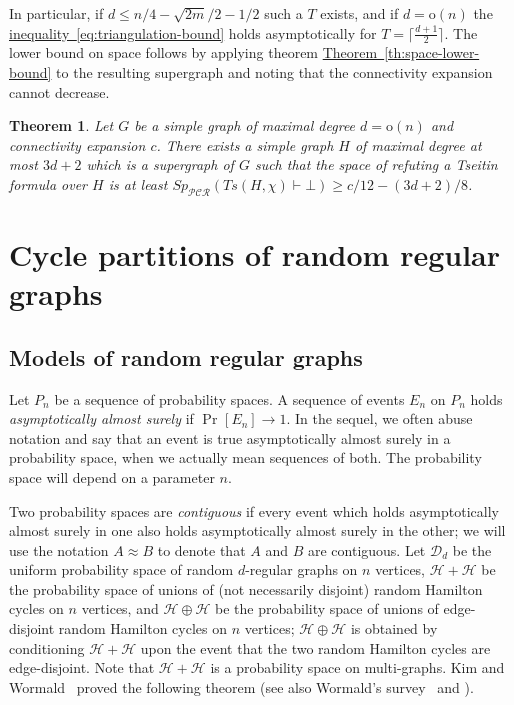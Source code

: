 \documentclass[11pt]{article}
\numberwithin{equation}{section}
\newtheorem{theorem}{Theorem}[section]
\theoremstyle{definition}
\theoremstyle{plain}
\newcommand{\expref}[2]{\hyperref[#2]{#1~\ref{#2}}}
\newcommand{\expeqref}[2]{\hyperref[#2]{#1~\eqref{#2}}}
\theoremstyle{plain}
\theoremstyle{definition}
\newcommand{\refth}[1]{\expref{Theorem}{#1}}
\newcommand{\littleoh}[1]{\mathrm{o} ( #1 )}
\newcommand{\Ceiling}[1]{\bigl \lceil #1 \bigr \rceil}
\newcommand{\prob}[2][]{\Pr_{#1} [ #2 ]}
\newcommand{\proofsystemsubindexformat}[1]{\scriptscriptstyle{\mathcal{#1}}}
\newcommand{\pcrnot}{\proofsystemsubindexformat{PCR}}
\newcommand{\derivabbrevsmall}[2]{( #1 \vdash #2 )}
\newcommand{\refutabbrevsmall}[1]{\derivabbrevsmall{#1}{\!\bot}}
\newcommand{\genericrefsmall}[3]{{\mathit{#1}}_{#2}\refutabbrevsmall{#3}}
\newcommand{\mspaceref}[2][]{\genericrefsmall{Sp}{#1}{#2}}
\newcommand{\formulaformat}[1]{\mathit{#1}}
\newcommand{\tseitinnot}[2]{\formulaformat{Ts}({#1,#2})}
\newcommand{\tends}{\longrightarrow}
\newcommand{\probspace}{\mathcal}
\newcommand{\psReg}{\probspace{D}}
\newcommand{\psHam}{\probspace{H}}
\newcommand{\connectivityexpansionnot}{c}
\newcommand{\tseitincharge}{\chi}
\begin{document}
In particular, if $d\leq n/4-\sqrt{2 m}/2-1/2$ such a $T$ exists, and if $d=\littleoh{n}$ the \expeqref{inequality}{eq:triangulation-bound} holds asymptotically for $T=\Ceiling{\frac{d+1}{2}}$. The lower bound on space follows by applying theorem \refth{th:space-lower-bound} to the resulting supergraph and noting that the connectivity expansion cannot decrease.

\begin{theorem}
\label{th:triangulation}
Let $G$ be a simple graph of maximal degree $d=\littleoh{n}$ and connectivity expansion $\connectivityexpansionnot$. There exists a simple graph $H$ of maximal degree at most $3d+2$ which is a supergraph of $G$ such that the space of refuting a Tseitin formula over $H$ is at least $\mspaceref[\pcrnot]{\tseitinnot{H}{\tseitincharge}} \geq \connectivityexpansionnot/12-(3d+2)/8$.
\end{theorem}
\section{Cycle partitions of random regular graphs} 
\label{sec:cycle-partitions}

\subsection{Models of random regular graphs}
Let $P_n$ be a sequence of probability spaces. A sequence of events $E_n$ on $P_n$ holds \emph{asymptotically almost surely} if $\prob{E_n} \tends 1$. In the sequel, we often abuse notation and say that an event is true asymptotically almost surely in a probability space, when we actually mean sequences of both. The probability space will depend on a parameter $n$.

Two probability spaces are \emph{contiguous} if every event which holds asymptotically almost surely in one also holds asymptotically almost surely in the other; we will use the notation $A \approx B$ to denote that $A$ and $B$ are contiguous.
%
%
%
%
Let $\psReg_d$ be the uniform probability space of random $d$-regular graphs on $n$ vertices, $\psHam+\psHam$ be the probability space of unions of (not necessarily disjoint) random Hamilton cycles on $n$ vertices, and $\psHam \oplus \psHam$ be the probability space of unions of edge-disjoint random Hamilton cycles on $n$ vertices; $\psHam \oplus \psHam$ is obtained by conditioning $\psHam + \psHam$ upon the event that the two random Hamilton cycles are edge-disjoint. Note that $\psHam + \psHam$ is a probability space on multi-graphs. Kim and Wormald~\cite{KW} proved the following theorem (see also Wormald's survey~\cite{W} and \cite[\S 9.3--9.6]{JLR}).
\end{document}
